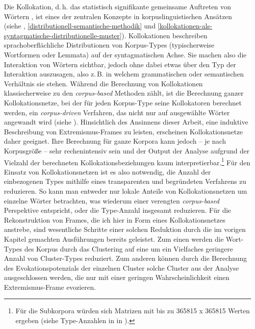 Die Kollokation, d.\,h. das statistisch signifikante gemeinsame Auftreten von Wörtern \autocite{bubenhoferSprachgebrauchsmusterKorpuslinguistikAls2009}, ist eines der zentralen Konzepte in korpuslinguistischen Ansätzen (siehe , \ref{distributionell-semantische-methodik} und \ref{kollokationen-als-syntagmatische-distributionelle-muster}). Kollokationen beschreiben sprachoberflächliche Distributionen von Korpus-Types (typischerweise Wortformen oder Lemmata) auf der syntagmatischen Achse. Sie machen also die Interaktion von Wörtern sichtbar, jedoch ohne dabei etwas über den Typ der Interaktion auszusagen, also z.\,B. in welchem grammatischen oder semantischen Verhältnis sie stehen. Während die Berechnung von Kollokationen klassischerweise zu den \emph{corpus-based} Methoden zählt, ist die Berechnung ganzer Kollokationsnetze, bei der für jeden Korpus-Type seine Kollokatoren berechnet werden, ein \emph{corpus-driven} Verfahren, das nicht nur auf ausgewählte Wörter angewandt wird (siehe ). Hinsichtlich des Ansinnens dieser Arbeit, eine induktive Beschreibung von Extremismus-Frames zu leisten, erscheinen Kollokationsnetze daher geeignet. Ihre Berechnung für ganze Korpora kann jedoch -- je nach Korpusgröße -- sehr rechenintensiv sein und der Output der Analyse aufgrund der Vielzahl der berechneten Kollokationsbeziehungen kaum interpretierbar.\footnote{Für die Subkorpora würden sich Matrizen mit bis zu 365815 x 365815 Werten ergeben (siehe Type-Anzahlen in  in ).} Für den Einsatz von Kollokationsnetzen ist es also notwendig, die Anzahl der einbezogenen Types mithilfe eines transparenten und begründeten Verfahrens zu reduzieren. So kann man entweder nur lokale Anteile von Kollokationsnetzen um einzelne Wörter betrachten, was wiederum einer verengten \emph{corpus-based} Perspektive entspricht, oder die Type-Anzahl insgesamt reduzieren. Für die Rekonstruktion von Frames, die ich hier in Form eines Kollokationsnetzes anstrebe, sind wesentliche Schritte einer solchen Reduktion durch die im vorigen Kapitel gemachten Ausführungen bereits geleistet. Zum einen werden die Wort-Types des Korpus durch das Clustering auf eine um ein Vielfaches geringere Anzahl von Cluster-Types reduziert. Zum anderen können durch die Berechnung des Evokationspotenzials der einzelnen Cluster solche Cluster aus der Analyse ausgeschlossen werden, die nur mit einer geringen Wahrscheinlichkeit einen Extremismus-Frame evozieren.

